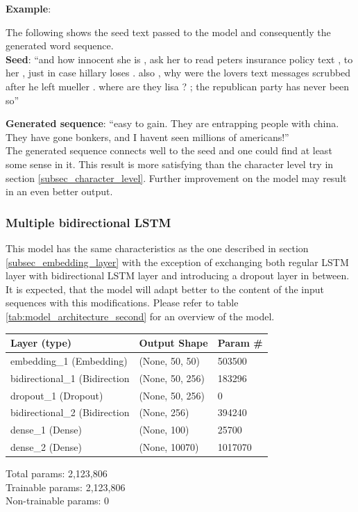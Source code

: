 \documentclass[hidelinks, conference]{IEEEtran}
\begin{document}
\textbf{Example}:

The following shows the seed text passed to the model and consequently the generated word sequence.\\

\textbf{Seed}: ``and how innocent she is , ask her to read peters insurance policy text , to her , just in case hillary loses . also , why were the lovers text messages scrubbed after he left mueller . where are they lisa ? ; the republican party has never been so''

\textbf{Generated sequence}: ``easy to gain. They are entrapping people with china. They have gone bonkers, and I havent seen millions of americans!''\\

The generated sequence connects well to the seed and one could find at least some sense in it. This result is more satisfying than the character level try in section \ref{subsec_character_level}. Further improvement on the model may result in an even better output.

\subsubsection{Multiple bidirectional LSTM}\label{subsec_multi_bi_lstm}

This model has the same characteristics as the one described in section \ref{subsec_embedding_layer} with the exception of exchanging both regular LSTM layer with bidirectional LSTM layer and introducing a dropout layer in between. It is expected, that the model will adapt better to the content of the input sequences with this modifications. Please refer to table \ref{tab:model_architecture_second} for an overview of the model.

\begin{center}
\begin{tabular}{l l l}
\hline
Layer (type) & Output Shape & Param \#\\
\hline
\hline
embedding\_1 (Embedding) & (None, 50, 50) & 503500\\
\hline
bidirectional\_1 (Bidirection & (None, 50, 256) & 183296\\
\hline
dropout\_1 (Dropout) & (None, 50, 256) & 0\\
\hline
bidirectional\_2 (Bidirection & (None, 256) & 394240\\
\hline
dense\_1 (Dense) & (None, 100) & 25700\\
\hline
dense\_2 (Dense) & (None, 10070) & 1017070\\
\hline
\hline
\end{tabular}
\begin{flushleft}
Total params: 2,123,806\\
Trainable params: 2,123,806\\
Non-trainable params: 0
\end{flushleft}
\end{center}
\end{document}
